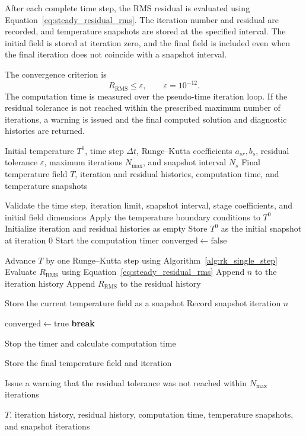 After each complete time step, the RMS residual is evaluated
using Equation~\eqref{eq:steady_residual_rms}. The iteration
number and residual are recorded, and temperature snapshots
are stored at the specified interval. The initial field is
stored at iteration zero, and the final field is included
even when the final iteration does not coincide with a
snapshot interval.

The convergence criterion is
\begin{equation}
\boxed{
R_{\mathrm{RMS}}\leq\varepsilon,
\qquad \varepsilon=10^{-12}.
}
\label{eq:rk_convergence_criterion}
\end{equation}
The computation time is measured over the pseudo-time
iteration loop. If the residual tolerance is not reached
within the prescribed maximum number of iterations, a
warning is issued and the final computed solution and
diagnostic histories are returned.

\begin{algorithm}[H]
\caption{Runge--Kutta Pseudo-Time Marching to Steady State}
\label{alg:rk_complete_solver}
\begin{algorithmic}[1]
\Require Initial temperature $T^0$, time step $\Delta t$,
Runge--Kutta coefficients $a_{sr},b_s$, residual tolerance
$\varepsilon$, maximum iterations $N_{\max}$, and snapshot
interval $N_s$
\Ensure Final temperature field $T$, iteration and residual
histories, computation time, and temperature snapshots

\State Validate the time step, iteration limit, snapshot interval,
stage coefficients, and initial field dimensions
\State Apply the temperature boundary conditions to $T^0$
\State Initialize iteration and residual histories as empty
\State Store $T^0$ as the initial snapshot at iteration $0$
\State Start the computation timer
\State $\mathrm{converged}\gets\mathrm{false}$

    \State Advance $T$ by one Runge--Kutta step using
    Algorithm~\ref{alg:rk_single_step}
    \State Evaluate $R_{\mathrm{RMS}}$ using
    Equation~\eqref{eq:steady_residual_rms}
    \State Append $n$ to the iteration history
    \State Append $R_{\mathrm{RMS}}$ to the residual history

        \State Store the current temperature field as a snapshot
        \State Record snapshot iteration $n$
    \EndIf

        \State $\mathrm{converged}\gets\mathrm{true}$
        \State \textbf{break}
    \EndIf
\EndFor

\State Stop the timer and calculate computation time

    \State Store the final temperature field and iteration
\EndIf

    \State Issue a warning that the residual tolerance was
    not reached within $N_{\max}$ iterations
\EndIf

\State \Return $T$, iteration history, residual history,
computation time, temperature snapshots, and snapshot iterations
\end{algorithmic}
\end{algorithm}

